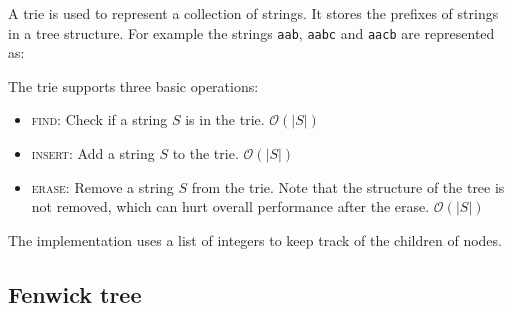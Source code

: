 A trie is used to represent a collection of strings. It stores the prefixes of strings in a tree structure. For example the strings  \texttt{aab}, \texttt{aabc} and \texttt{aacb} are represented as:
\vspace{-0.3cm}
\begin{figure}[H]
    \centering
\end{figure}
\vspace{-0.3cm}
The trie supports three basic operations:
\begin{itemize}
    \item \textsc{find:} Check if a string $S$ is in the trie. $\mathcal O(|S|)$
    \item \textsc{insert:} Add a string $S$ to the trie. $\mathcal O(|S|)$
    \item \textsc{erase:} Remove a string $S$ from the trie. Note that the structure of the tree is not removed, which can hurt overall performance after the erase. $\mathcal O(|S|)$
\end{itemize}
The implementation uses a list of integers to keep track of the children of nodes.



\subsection{Fenwick tree}


